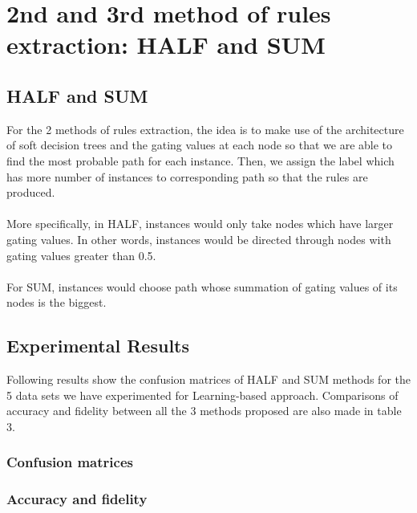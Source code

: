 \documentclass[12pt]{article}%
\begin{document}
\section{2nd and 3rd method of rules extraction: HALF and SUM}

\subsection{HALF and SUM}
For the 2 methods of rules extraction, the idea is to make use of the architecture of soft decision trees and the gating values at each node so that we are able to find the most probable path for each instance. Then, we assign the label which has more number of instances to corresponding path so that the rules are produced. 
\\\\
More specifically, in HALF, instances would only take nodes which have larger gating values. In other words,  instances would be directed through nodes with gating values greater than 0.5.
\\\\
For SUM, instances would choose path whose summation of gating values of its nodes is the biggest. 

\subsection{Experimental Results}
Following results show the confusion matrices of HALF and SUM methods for the 5 data sets we have experimented for Learning-based approach. Comparisons of accuracy and fidelity between all the 3 methods proposed are also made in table 3.

\subsubsection{Confusion matrices}


\subsubsection{Accuracy and fidelity}
\end{document}
